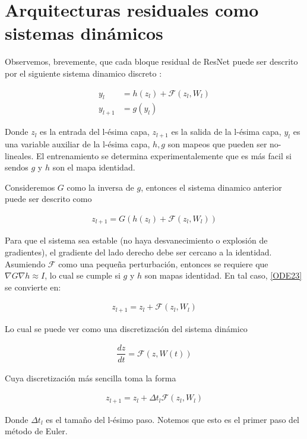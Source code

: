 \documentclass[titlepage,a4paper,oneside]{article}
\begin{document}
\section{Arquitecturas residuales como sistemas dinámicos}
Observemos, brevemente, que cada bloque residual de ResNet puede ser descrito por el siguiente sistema dinamico discreto \cite{E-2017}:

\begin{align}\label{ODE_ResNet}
	    y_l &= h(z_l) + \mathscr{F}(z_l, W_l)\\
	y_{l+1} &= g(y_l)
\end{align}

Donde $z_l$ es la entrada del l-ésima capa, $z_{l+1}$ es la salida de la l-ésima capa, $y_l$ es una variable auxiliar de la l-ésima capa, $h, g$ son mapeos que pueden ser no-lineales. El entrenamiento se determina experimentalemente \cite{he2016identity} que es más facil si sendos $g$ y $h$ son el mapa identidad.

Consideremos $G$ como la inversa de $g$, entonces el sistema dinamico anterior puede ser descrito como

\begin{align}\label{ODE23}
	z_{l+1} = G(h(z_l) + \mathscr{F}(z_l, W_l))
\end{align}

Para que el sistema sea estable (no haya desvanecimiento o explosión de gradientes), el gradiente del lado derecho debe ser cercano a la identidad. Asumiendo $\mathscr{F}$ como una pequeña perturbación, entonces se requiere que $\nabla G \nabla h \approx I$, lo cual se cumple si $g$ y $h$ son mapas identidad. En tal caso, \ref{ODE23} se convierte en:

\begin{align}
	z_{l+1} = z_l + \mathscr{F}(z_l, W_l)
\end{align}

Lo cual se puede ver como una discretización del sistema dinámico

\begin{align}
	\dfrac{dz}{dt} = \mathscr{F}(z, W(t))
\end{align}

Cuya discretización más sencilla toma la forma

\begin{align}
	z_{l+1} = z_l + \Delta t_l \mathscr{F}(z_l, W_l)
\end{align}

Donde $\Delta t_l$ es el tamaño del l-ésimo paso. Notemos que esto es el primer paso del método de Euler.
\end{document}
